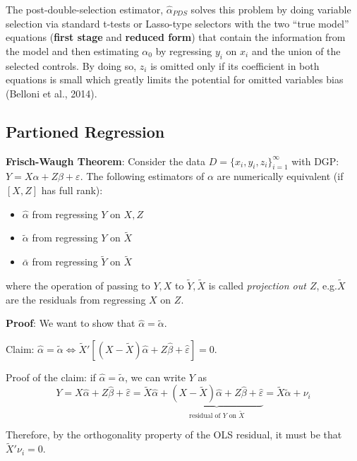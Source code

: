 \documentclass[12pt,]{book}
\providecommand{\tightlist}{%
  \setlength{\itemsep}{0pt}\setlength{\parskip}{0pt}}
\begin{document}
The post-double-selection estimator, \(\hat{\alpha}_{PDS}\) solves this problem by doing variable selection via standard t-tests or Lasso-type selectors with the two ``true model'' equations (\textbf{first stage} and \textbf{reduced form}) that contain the information from the model and then estimating \(\alpha_0\) by regressing \(y_i\) on \(x_i\) and the union of the selected controls. By doing so, \(z_i\) is omitted only if its coefficient in both equations is small which greatly limits the potential for omitted variables bias (Belloni et al., 2014).

\hypertarget{partioned-regression}{%
\subsection{Partioned Regression}\label{partioned-regression}}

\textbf{Frisch-Waugh Theorem}:
Consider the data \(D = \{ x_i, y_i, z_i \}_{i=1}^\infty\) with DGP: \(Y = X \alpha + Z \beta + \varepsilon\). The following estimators of \(\alpha\) are numerically equivalent (if \([X, Z]\) has full rank):

\begin{itemize}
\tightlist
\item
  \(\hat{\alpha}\) from regressing \(Y\) on \(X, Z\)
\item
  \(\tilde{\alpha}\) from regressing \(Y\) on \(\tilde{X}\)
\item
  \(\bar{\alpha}\) from regressing \(\tilde{Y}\) on \(\tilde{X}\)
\end{itemize}

where the operation of passing to \(Y, X\) to \(\tilde{Y}, \tilde{X}\) is called \emph{projection out \(Z\)}, e.g.\(\tilde{X}\) are the residuals from regressing \(X\) on \(Z\).

\textbf{Proof}:
We want to show that \(\hat{\alpha} = \tilde{\alpha}\).

Claim: \(\hat{\alpha } = \tilde{\alpha} \Leftrightarrow \tilde{X}' \left[ (X - \tilde{X})\hat{\alpha} + Z \hat{\beta} +\hat{\varepsilon} \right] = 0\).

Proof of the claim: if \(\hat{\alpha} = \tilde{\alpha}\), we can write \(Y\) as
\[
    Y =  X \hat{\alpha} + Z \hat{\beta} + \hat{\varepsilon}  = \tilde{X} \hat{\alpha} + \underbrace{(X - \tilde{X}) \hat{\alpha } + Z \hat{\beta} + \hat{\varepsilon}}_\text{residual of $Y$ on $\tilde{X} $} = \tilde{X} \tilde{\alpha} + \nu_i
\]

Therefore, by the orthogonality property of the OLS residual, it must be that \(\tilde{X}'\nu_i= 0\).
\[\tag*{$\blacksquare$}\]
\end{document}

